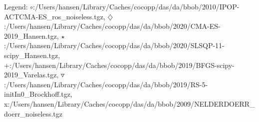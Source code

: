 Legend: {\color{CornflowerBlue}$\circ$}:/Users/hansen/Library/Caches/cocopp/das/da/bbob/2010/IPOP-ACTCMA-ES\_ros\_noiseless.tgz, {{}$\diamondsuit$}:/Users/hansen/Library/Caches/cocopp/das/da/bbob/2020/CMA-ES-2019\_Hansen.tgz, {\color{Green}$\star$}:/Users/hansen/Library/Caches/cocopp/das/da/bbob/2020/SLSQP-11-scipy\_Hansen.tgz, {\color{red}+}:/Users/hansen/Library/Caches/cocopp/das/da/bbob/2019/BFGS-scipy-2019\_Varelas.tgz, {\color{brown}$\triangledown$}:/Users/hansen/Library/Caches/cocopp/das/da/bbob/2019/RS-5-initIn0\_Brockhoff.tgz, {{}x}:/Users/hansen/Library/Caches/cocopp/das/da/bbob/2009/NELDERDOERR\_doerr\_noiseless.tgz